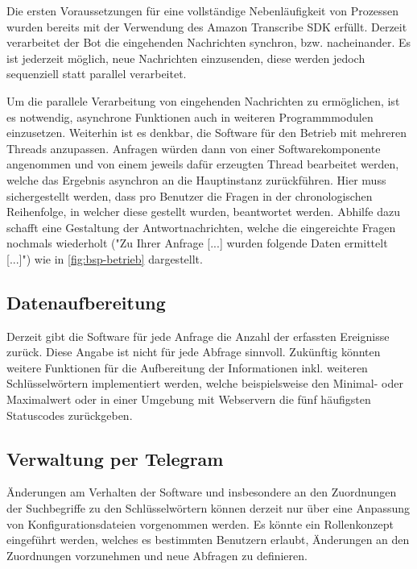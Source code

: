 Die ersten Voraussetzungen für eine vollständige Nebenläufigkeit von Prozessen wurden bereits mit der Verwendung des Amazon Transcribe SDK erfüllt. Derzeit verarbeitet der Bot die eingehenden Nachrichten synchron, bzw. nacheinander. Es ist jederzeit möglich, neue Nachrichten einzusenden, diese werden jedoch sequenziell statt parallel verarbeitet. 

Um die parallele Verarbeitung von eingehenden Nachrichten zu ermöglichen, ist es notwendig, asynchrone Funktionen auch in weiteren Programmmodulen einzusetzen. Weiterhin ist es denkbar, die Software für den Betrieb mit mehreren Threads anzupassen. Anfragen würden dann von einer Softwarekomponente angenommen und von einem jeweils dafür erzeugten Thread bearbeitet werden, welche das Ergebnis asynchron an die Hauptinstanz zurückführen. Hier muss sichergestellt werden, dass pro Benutzer die Fragen in der chronologischen Reihenfolge, in welcher diese gestellt wurden, beantwortet werden. Abhilfe dazu schafft eine Gestaltung der Antwortnachrichten, welche die eingereichte Fragen nochmals wiederholt ("Zu Ihrer Anfrage [...] wurden folgende Daten ermittelt [...]") wie in \autoref{fig:bsp-betrieb} dargestellt.

\subsection{Datenaufbereitung}

Derzeit gibt die Software für jede Anfrage die Anzahl der erfassten Ereignisse zurück. Diese Angabe ist nicht für jede Abfrage sinnvoll. Zukünftig könnten weitere Funktionen für die Aufbereitung der Informationen inkl. weiteren Schlüsselwörtern implementiert werden, welche beispielsweise den Minimal- oder Maximalwert oder in einer Umgebung mit Webservern die fünf häufigsten Statuscodes zurückgeben.

\subsection{Verwaltung per Telegram}

Änderungen am Verhalten der Software und insbesondere an den Zuordnungen der Suchbegriffe zu den Schlüsselwörtern können derzeit nur über eine Anpassung von Konfigurationsdateien vorgenommen werden. Es könnte ein Rollenkonzept eingeführt werden, welches es bestimmten Benutzern erlaubt, Änderungen an den Zuordnungen vorzunehmen und neue Abfragen zu definieren.
